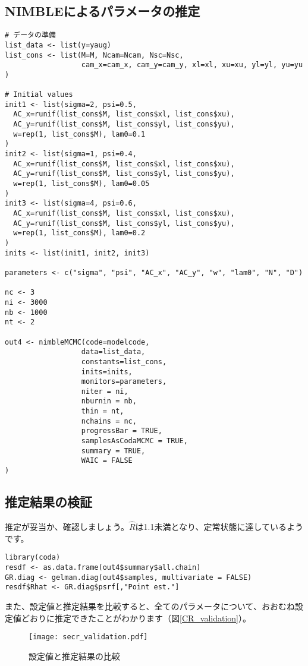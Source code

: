	\subsection{NIMBLEによるパラメータの推定}
\begin{verbatim}
# データの準備
list_data <- list(y=yaug)
list_cons <- list(M=M, Ncam=Ncam, Nsc=Nsc,
                  cam_x=cam_x, cam_y=cam_y, xl=xl, xu=xu, yl=yl, yu=yu
)

# Initial values
init1 <- list(sigma=2, psi=0.5,
  AC_x=runif(list_cons$M, list_cons$xl, list_cons$xu),
  AC_y=runif(list_cons$M, list_cons$yl, list_cons$yu),
  w=rep(1, list_cons$M), lam0=0.1
)
init2 <- list(sigma=1, psi=0.4,
  AC_x=runif(list_cons$M, list_cons$xl, list_cons$xu),
  AC_y=runif(list_cons$M, list_cons$yl, list_cons$yu),
  w=rep(1, list_cons$M), lam0=0.05
)
init3 <- list(sigma=4, psi=0.6,
  AC_x=runif(list_cons$M, list_cons$xl, list_cons$xu),
  AC_y=runif(list_cons$M, list_cons$yl, list_cons$yu),
  w=rep(1, list_cons$M), lam0=0.2
)
inits <- list(init1, init2, init3)

parameters <- c("sigma", "psi", "AC_x", "AC_y", "w", "lam0", "N", "D")

nc <- 3
ni <- 3000
nb <- 1000
nt <- 2

out4 <- nimbleMCMC(code=modelcode,
                  data=list_data,
                  constants=list_cons,
                  inits=inits,
                  monitors=parameters,
                  niter = ni,
                  nburnin = nb,
                  thin = nt,
                  nchains = nc,
                  progressBar = TRUE,
                  samplesAsCodaMCMC = TRUE,
                  summary = TRUE,
                  WAIC = FALSE
)
\end{verbatim}

\subsection{推定結果の検証}
推定が妥当か、確認しましょう。$\hat{R}$は1.1未満となり、定常状態に達しているようです。
\begin{verbatim}
library(coda)
resdf <- as.data.frame(out4$summary$all.chain)
GR.diag <- gelman.diag(out4$samples, multivariate = FALSE)
resdf$Rhat <- GR.diag$psrf[,"Point est."]
\end{verbatim}
また、設定値と推定結果を比較すると、全てのパラメータについて、おおむね設定値どおりに推定できたことがわかります（図\ref{CR_validation}）。
\begin{figure}[htb]
\begin{center}
\graphicspath{{4_hm/figs/}}
\texttt{[image: secr\_validation.pdf]}\\
\caption{設定値と推定結果の比較}
\label{secr_validation}
\end{center}
\end{figure}

